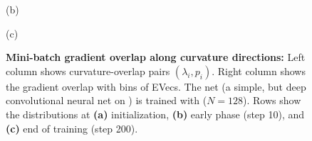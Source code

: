 \begin{figure}[!b]
  \vspace{-2.5\baselineskip}

  \begin{flushleft}
    \vspace{1ex}
    (b)
  \end{flushleft}
  \vspace{-2\baselineskip}

  \hfill
  \begin{minipage}[t]{0.495\linewidth}
    \centering
    
  \end{minipage}
  \begin{minipage}[t]{0.495\linewidth}
    \centering
    
  \end{minipage}
  \hfill

  \vspace{-2.5\baselineskip}

  \begin{flushleft}
    \vspace{1ex}
    (c)
  \end{flushleft}
  \vspace{-2\baselineskip}

  \hfill
  \begin{minipage}[t]{0.495\linewidth}
    \centering
    
  \end{minipage}
  \begin{minipage}[t]{0.495\linewidth}
    \centering
    
  \end{minipage}
  \hfill
  \vspace{-2\baselineskip}

  \caption{\textbf{Mini-batch gradient overlap along \ggn curvature directions:}
    Left column shows curvature-overlap pairs $(\lambda_i, p_i)$. Right column
    shows the gradient overlap with bins of EVecs. The net (a simple, but
    deep convolutional neural net on \mnist) is trained with \sgd ($N=128$).
    Rows show the distributions at \textbf{(a)} initialization,
    \textbf{(b)} early phase (step 10), and \textbf{(c)} end of training
    (step 200).}
  \label{fig:gradient-curvature-overlap}
\end{figure}

